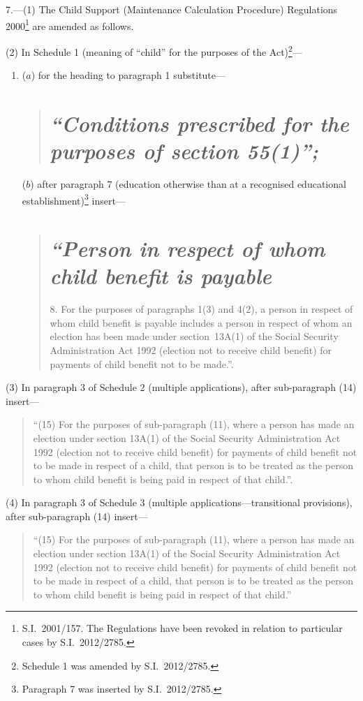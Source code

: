 \documentclass[12pt,a4paper]{article}
\begin{document}
7.---(1)  The Child Support (Maintenance Calculation Procedure) Regulations 2000\footnote{S.I.~2001/157. The Regulations have been revoked in relation to particular cases by S.I.~2012/2785.} are amended as follows.

(2) In Schedule 1 (meaning of “child” for the purposes of the Act)\footnote{Schedule 1 was amended by S.I.~2012/2785.}—
\begin{enumerate}\item[]
($a$) for the heading to paragraph 1 substitute—
\begin{quotation}
\section*{\itshape “Conditions prescribed for the purposes of section 55(1)”;}
\end{quotation}

($b$) after paragraph 7 (education otherwise than at a recognised educational establishment)\footnote{Paragraph 7 was inserted by S.I.~2012/2785.} insert—
\begin{quotation}
\section*{\itshape “Person in respect of whom child benefit is payable}

8.  For the purposes of paragraphs 1(3) and 4(2), a person in respect of whom child benefit is payable includes a person in respect of whom an election has been made under section~13A(1) of the Social Security Administration Act 1992 (election not to receive child benefit) for payments of child benefit not to be made.”.
\end{quotation}
\end{enumerate}

(3) In paragraph 3 of Schedule 2 (multiple applications), after sub-paragraph (14) insert—
\begin{quotation}
“(15) For the purposes of sub-paragraph (11), where a person has made an election under section 13A(1) of the Social Security Administration Act 1992 (election not to receive child benefit) for payments of child benefit not to be made in respect of a child, that person is to be treated as the person to whom child benefit is being paid in respect of that child.”.
\end{quotation}

(4) In paragraph 3 of Schedule 3 (multiple applications---transitional provisions), after sub-paragraph (14) insert—
\begin{quotation}
“(15) For the purposes of sub-paragraph (11), where a person has made an election under section 13A(1) of the Social Security Administration Act 1992 (election not to receive child benefit) for payments of child benefit not to be made in respect of a child, that person is to be treated as the person to whom child benefit is being paid in respect of that child.”
\end{quotation}
\end{document}

